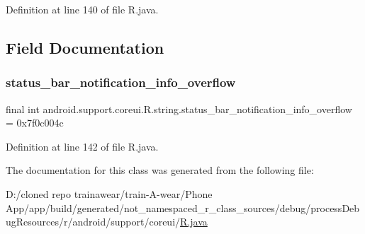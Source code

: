 Definition at line 140 of file R.\+java.


\begin{DoxyCode}{0}

\end{DoxyCode}


\subsection{Field Documentation}
\mbox{\label{classandroid_1_1support_1_1coreui_1_1_r_1_1string_adcf4ea883d32357717589d816f0e05ce}} 
\subsubsection{\texorpdfstring{status\_bar\_notification\_info\_overflow}{status\_bar\_notification\_info\_overflow}}
{\footnotesize\ttfamily final int android.\+support.\+coreui.\+R.\+string.\+status\+\_\+bar\+\_\+notification\+\_\+info\+\_\+overflow = 0x7f0c004c\hspace{0.3cm}{\ttfamily [static]}}



Definition at line 142 of file R.\+java.



The documentation for this class was generated from the following file\+:\begin{DoxyCompactItemize}
\item 
D\+:/cloned repo trainawear/train-\/\+A-\/wear/\+Phone App/app/build/generated/not\+\_\+namespaced\+\_\+r\+\_\+class\+\_\+sources/debug/process\+Debug\+Resources/r/android/support/coreui/\mbox{\hyperlink{process_debug_resources_2r_2android_2support_2coreui_2_r_8java}{R.\+java}}\end{DoxyCompactItemize}
